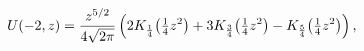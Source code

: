 \[\mathop{U\/}\nolimits\!\left(-2,z\right)=\frac{z^{5/2}}{4\sqrt{2\pi}}\left(2\!%
\mathop{K_{\frac{1}{4}}\/}\nolimits\!\left(\tfrac{1}{4}z^{2}\right)+3\!\mathop%
{K_{\frac{3}{4}}\/}\nolimits\!\left(\tfrac{1}{4}z^{2}\right)-\mathop{K_{\frac{%
5}{4}}\/}\nolimits\!\left(\tfrac{1}{4}z^{2}\right)\right),\]